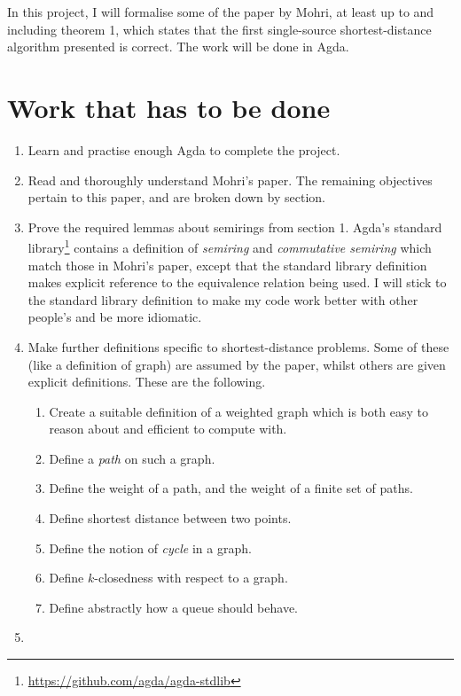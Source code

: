 In this project, I will formalise some of the paper by Mohri, at least up to and including theorem 1, which states that the first single-source shortest-distance algorithm presented is correct.
The work will be done in Agda.

\section*{Work that has to be done}

\begin{enumerate}
  \item
    Learn and practise enough Agda to complete the project.
  \item
    Read and thoroughly understand Mohri's paper.
    The remaining objectives pertain to this paper, and are broken down by section.
  \item
    Prove the required lemmas about semirings from section 1.
    Agda's standard library\footnote{\url{https://github.com/agda/agda-stdlib}} contains a definition of \emph{semiring} and \emph{commutative semiring} which match those in Mohri's paper, except that the standard library definition makes explicit reference to the equivalence relation being used.
    I will stick to the standard library definition to make my code work better with other people's and be more idiomatic.
  \item
    Make further definitions specific to shortest-distance problems.
    Some of these (like a definition of graph) are assumed by the paper, whilst others are given explicit definitions.
    These are the following.
    \begin{enumerate}
      \item
        Create a suitable definition of a weighted graph which is both easy to reason about and efficient to compute with.
      \item
        Define a \emph{path} on such a graph.
      \item
        Define the weight of a path, and the weight of a finite set of paths.
      \item
        Define shortest distance between two points.
      \item
        Define the notion of \emph{cycle} in a graph.
      \item
        Define $k$-closedness with respect to a graph.
      \item
        Define abstractly how a queue should behave.
    \end{enumerate}
  \item

\end{enumerate}
